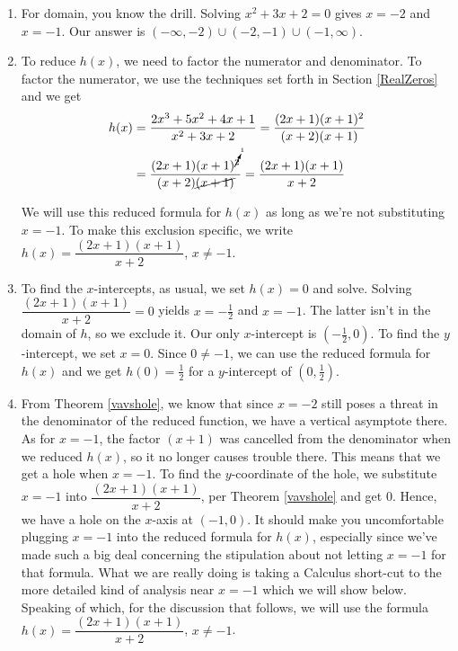 \medskip

{
\begin{enumerate}

\item  For domain, you know the drill.  Solving $x^2+3x+2 = 0$ gives $x = -2$ and $x=-1$.  Our answer is $(-\infty, -2) \cup (-2, -1) \cup (-1, \infty)$.

\item  To reduce $h(x)$, we need to factor the numerator and denominator.  To factor the numerator, we use the techniques set forth in Section \ref{RealZeros} and we get  
\begin{align*}
h(x) & =  \dfrac{2x^3+5x^2+4x+1}{x^2+3x+2} = \dfrac{(2x+1)(x+1)^2}{(x+2)(x+1)}\\
& = \dfrac{ (2x+1) (x+1)^{\cancelto{1}{2}}  }{(x+2)\cancel{(x+1)}} = \dfrac{(2x+1)(x+1)}{x+2}
\end{align*}

We will use this reduced formula for $h(x)$ as long as we're not substituting $x=-1$.  To make this exclusion specific, we write $h(x) = \dfrac{(2x+1)(x+1)}{x+2}$, $x \neq -1$.

\item  To find the $x$-intercepts, as usual, we set $h(x) = 0$ and solve.  Solving $\dfrac{(2x+1)(x+1)}{x+2}=0$ yields $x=-\frac{1}{2}$ and $x=-1$.  The latter isn't in the domain of $h$, so we exclude it.  Our only $x$-intercept is $\left(-\frac{1}{2}, 0\right)$.  To find the $y$-intercept, we set $x=0$.  Since $0 \neq -1$, we can use the reduced formula for $h(x)$ and we get $h(0) = \frac{1}{2}$ for a $y$-intercept of $\left(0,\frac{1}{2}\right)$.

\item  From Theorem \ref{vavshole}, we know that since $x=-2$ still poses a threat in the denominator of the reduced function, we have a vertical asymptote there.  As for $x=-1$, the factor $(x+1)$ was cancelled from the denominator when we reduced $h(x)$, so it no longer causes trouble there.  This means that we get a hole when $x=-1$.  To find the $y$-coordinate of the hole, we substitute $x=-1$ into $\dfrac{(2x+1)(x+1)}{x+2}$, per Theorem \ref{vavshole} and get $0$.  Hence, we have a hole on the $x$-axis at $(-1,0)$.  It should make you uncomfortable plugging $x=-1$ into the reduced formula for $h(x)$, especially since we've made such a big deal concerning the stipulation about not letting $x=-1$ for that formula.  What we are really doing is taking a Calculus short-cut to the more detailed kind of analysis near $x=-1$ which we will show below.  Speaking of which, for the discussion that follows,  we will use the formula $h(x) = \dfrac{(2x+1)(x+1)}{x+2}$, $x \neq -1$.


\end{enumerate}}
